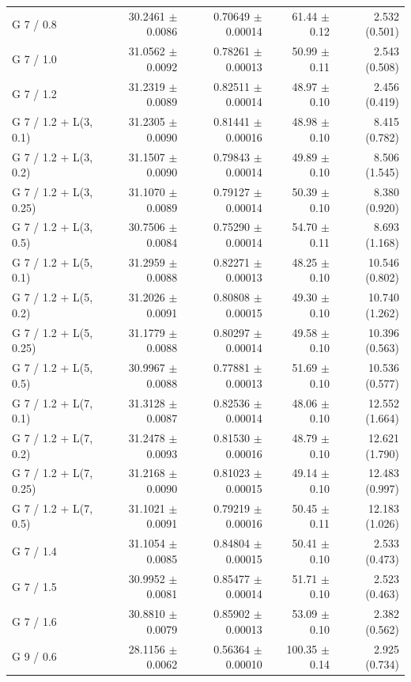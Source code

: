 \begin{longtable}{lrrrr}
G 7 / 0.8 & 30.2461 $\pm$ 0.0086 & 0.70649 $\pm$ 0.00014 & 61.44 $\pm$ 0.12 & 2.532 (0.501) \\
G 7 / 1.0 & 31.0562 $\pm$ 0.0092 & 0.78261 $\pm$ 0.00013 & 50.99 $\pm$ 0.11 & 2.543 (0.508) \\
G 7 / 1.2 & 31.2319 $\pm$ 0.0089 & 0.82511 $\pm$ 0.00014 & 48.97 $\pm$ 0.10 & 2.456 (0.419) \\
G 7 / 1.2 + L(3, 0.1) & 31.2305 $\pm$ 0.0090 & 0.81441 $\pm$ 0.00016 & 48.98 $\pm$ 0.10 & 8.415 (0.782) \\
G 7 / 1.2 + L(3, 0.2) & 31.1507 $\pm$ 0.0090 & 0.79843 $\pm$ 0.00014 & 49.89 $\pm$ 0.10 & 8.506 (1.545) \\
G 7 / 1.2 + L(3, 0.25) & 31.1070 $\pm$ 0.0089 & 0.79127 $\pm$ 0.00014 & 50.39 $\pm$ 0.10 & 8.380 (0.920) \\
G 7 / 1.2 + L(3, 0.5) & 30.7506 $\pm$ 0.0084 & 0.75290 $\pm$ 0.00014 & 54.70 $\pm$ 0.11 & 8.693 (1.168) \\
G 7 / 1.2 + L(5, 0.1) & 31.2959 $\pm$ 0.0088 & 0.82271 $\pm$ 0.00013 & 48.25 $\pm$ 0.10 & 10.546 (0.802) \\
G 7 / 1.2 + L(5, 0.2) & 31.2026 $\pm$ 0.0091 & 0.80808 $\pm$ 0.00015 & 49.30 $\pm$ 0.10 & 10.740 (1.262) \\
G 7 / 1.2 + L(5, 0.25) & 31.1779 $\pm$ 0.0088 & 0.80297 $\pm$ 0.00014 & 49.58 $\pm$ 0.10 & 10.396 (0.563) \\
G 7 / 1.2 + L(5, 0.5) & 30.9967 $\pm$ 0.0088 & 0.77881 $\pm$ 0.00013 & 51.69 $\pm$ 0.10 & 10.536 (0.577) \\
G 7 / 1.2 + L(7, 0.1) & 31.3128 $\pm$ 0.0087 & 0.82536 $\pm$ 0.00014 & 48.06 $\pm$ 0.10 & 12.552 (1.664) \\
G 7 / 1.2 + L(7, 0.2) & 31.2478 $\pm$ 0.0093 & 0.81530 $\pm$ 0.00016 & 48.79 $\pm$ 0.10 & 12.621 (1.790) \\
G 7 / 1.2 + L(7, 0.25) & 31.2168 $\pm$ 0.0090 & 0.81023 $\pm$ 0.00015 & 49.14 $\pm$ 0.10 & 12.483 (0.997) \\
G 7 / 1.2 + L(7, 0.5) & 31.1021 $\pm$ 0.0091 & 0.79219 $\pm$ 0.00016 & 50.45 $\pm$ 0.11 & 12.183 (1.026) \\
G 7 / 1.4 & 31.1054 $\pm$ 0.0085 & 0.84804 $\pm$ 0.00015 & 50.41 $\pm$ 0.10 & 2.533 (0.473) \\
G 7 / 1.5 & 30.9952 $\pm$ 0.0081 & 0.85477 $\pm$ 0.00014 & 51.71 $\pm$ 0.10 & 2.523 (0.463) \\
G 7 / 1.6 & 30.8810 $\pm$ 0.0079 & 0.85902 $\pm$ 0.00013 & 53.09 $\pm$ 0.10 & 2.382 (0.562) \\
G 9 / 0.6 & 28.1156 $\pm$ 0.0062 & 0.56364 $\pm$ 0.00010 & 100.35 $\pm$ 0.14 & 2.925 (0.734) \\

\end{longtable}
